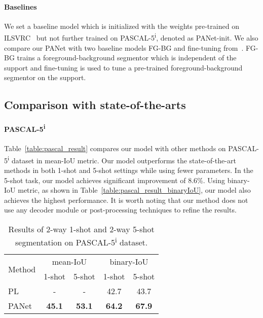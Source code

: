 \documentclass[10pt,twocolumn,letterpaper]{article}
\begin{document}
\vspace{-11pt}
\paragraph{Baselines} We set a baseline model which is initialized with the weights pre-trained on ILSVRC~\cite{ILSVRC15} but not further trained on PASCAL-5\textsuperscript{i}, denoted as PANet-init. We also compare our PANet with two baseline models FG-BG and fine-tuning from~\cite{rakelly2018conditional}. FG-BG trains a foreground-background segmentor which is independent of the support and fine-tuning is used to tune a pre-trained foreground-background segmentor on the support.

\subsection{Comparison with state-of-the-arts}

\paragraph{PASCAL-5\textsuperscript{i}} Table~\ref{table:pascal_result} compares our model with other methods on PASCAL-5\textsuperscript{i} dataset in mean-IoU metric. Our model outperforms the state-of-the-art methods in both 1-shot and 5-shot settings while using fewer parameters. In the 5-shot task, our model achieves significant improvement of 8.6\%.  Using binary-IoU metric, as shown in Table~\ref{table:pascal_result_binaryIoU}, our model also achieves the highest performance. It is worth noting that our method does not use any decoder module or post-processing techniques to refine the results.

\begin{table}[t!]
\centering
 \begin{tabular}{l|c c|c c} 
\toprule
 \multirow{2}{*}{Method} &
 \multicolumn{2}{c|}{mean-IoU} &
 \multicolumn{2}{c}{binary-IoU}
 \\
 \cmidrule{2-5}
 & 1-shot & 5-shot & 1-shot & 5-shot
 \\
 \midrule
 PL~\cite{dong2018few}
        & - & - & 42.7 & 43.7
 \\
PANet
        & \textbf{45.1} & \textbf{53.1} & \textbf{64.2} & \textbf{67.9}
 \\
\bottomrule
 \end{tabular}
 \caption{Results of 2-way 1-shot and 2-way 5-shot segmentation on PASCAL-5\textsuperscript{i} dataset.}
\label{table:pascal_result_multiway}
\end{table}
\end{document}

